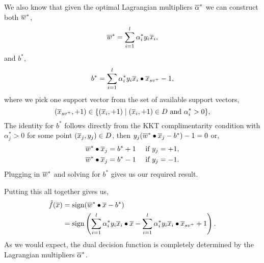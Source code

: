 \documentclass[a4paper,blends,pdf,colorBG,slideColor]{prosper}
\begin{document}
\es


We also know that given the optimal Lagrangian multipliers $\overline{\alpha}^*$ we can
construct both $\overline{w}^*$,
\begin{equation*}
\overline{w}^* = \sum_{i=1}^l \alpha^*_i y_i  \overline{x}_i,
\end{equation*}
and $b^*$,
\begin{equation*}
b^*  = \sum_{i=1}^l \alpha^*_i y_i  \overline{x}_i\bullet\overline{x}_{sv^+} - 1,
\end{equation*}
where we pick one support vector from the set of available support vectors,
\begin{equation*}
(\overline{x}_{sv^+},+1) \in \{(\overline{x}_i,+1) \mid (\overline{x}_i,+1)\in D \text{ and } \alpha^*_i > 0\},
\end{equation*}
The identity for $b^*$ follows directly from the KKT complimentarity condition with $\alpha^*_j > 0$ for some point $(\overline{x}_j,y_j)\in D$, then 
$y_j(\overline{w}^*\bullet\overline{x}_j-b^*) - 1 = 0$ or,
\begin{align*}
\overline{w}^*\bullet\overline{x}_j & = b^* + 1 \quad\text{ if $y_j = +1$},\\
\overline{w}^*\bullet\overline{x}_j & = b^* - 1 \quad\text{ if $y_j = -1$}.
\end{align*}
Plugging in $\overline{w}^*$ and solving for $b^*$ gives us our required result.


\es

Putting this all together gives us,
\begin{align*}
\model{f}(\ol{x}) &= \sign (\ol{w}^*\bullet\ol{x} -b^*)\\
&= \sign \left ( \sum_{i=1}^l \alpha^*_i y_i \ol{x}_i\bullet\ol{x} - \sum_{i=1}^l \alpha^*_i y_i  \ol{x}_i\bullet\ol{x}_{sv^+} + 1\right ).
\end{align*}
As we would expect, the dual decision function is completely determined by the
Lagrangian multipliers $\overline{\alpha}^*$.
\end{document}
